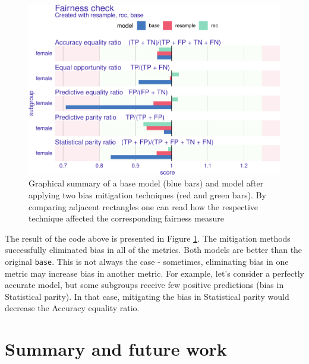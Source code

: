 \begin{Schunk}
\begin{figure}

{\centering \includegraphics[width=0.8\linewidth]{RJ-2022-019_files/figure-latex/mitigation-1} 

}

\caption[Graphical summary of a base model (blue bars) and model after applying two bias mitigation techniques (red and green bars)]{Graphical summary of a base model (blue bars) and model after applying two bias mitigation techniques (red and green bars). By comparing adjacent rectangles one can read how the respective technique affected the corresponding fairness measure}\label{fig:mitigation}
\end{figure}
\end{Schunk}

The result of the code above is presented in Figure
\ref{fig:mitigation}. The mitigation methods successfully eliminated
bias in all of the metrics. Both models are better than the original
\texttt{base}. This is not always the case - sometimes, eliminating bias
in one metric may increase bias in another metric. For example, let's
consider a perfectly accurate model, but some subgroups receive few
positive predictions (bias in Statistical parity). In that case,
mitigating the bias in Statistical parity would decrease the Accuracy
equality ratio.

\hypertarget{summary-and-future-work}{%
\section{Summary and future work}\label{summary-and-future-work}}

